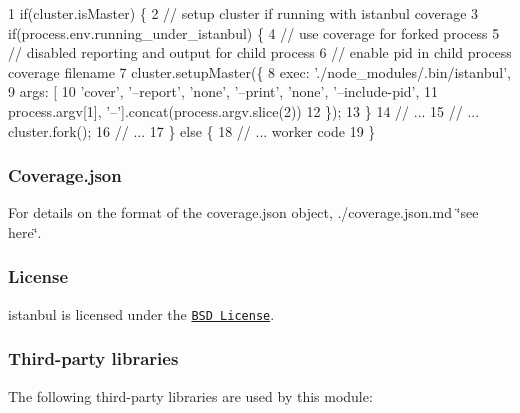 \begin{DoxyCode}
1 if(cluster.isMaster) \{
2     // setup cluster if running with istanbul coverage
3     if(process.env.running\_under\_istanbul) \{
4         // use coverage for forked process
5         // disabled reporting and output for child process
6         // enable pid in child process coverage filename
7         cluster.setupMaster(\{
8             exec: './node\_modules/.bin/istanbul',
9             args: [
10                 'cover', '--report', 'none', '--print', 'none', '--include-pid',
11                 process.argv[1], '--'].concat(process.argv.slice(2))
12         \});
13     \}
14     // ...
15     // ... cluster.fork();
16     // ...
17 \} else \{
18     // ... worker code
19 \}
\end{DoxyCode}


\subsubsection*{Coverage.\+json}

For details on the format of the coverage.\+json object, ./coverage.json.\+md \char`\"{}see here\char`\"{}.

\subsubsection*{License}

istanbul is licensed under the \href{http://github.com/gotwarlost/istanbul/raw/master/LICENSE}{\tt B\+S\+D License}.

\subsubsection*{Third-\/party libraries}

The following third-\/party libraries are used by this module\+:


